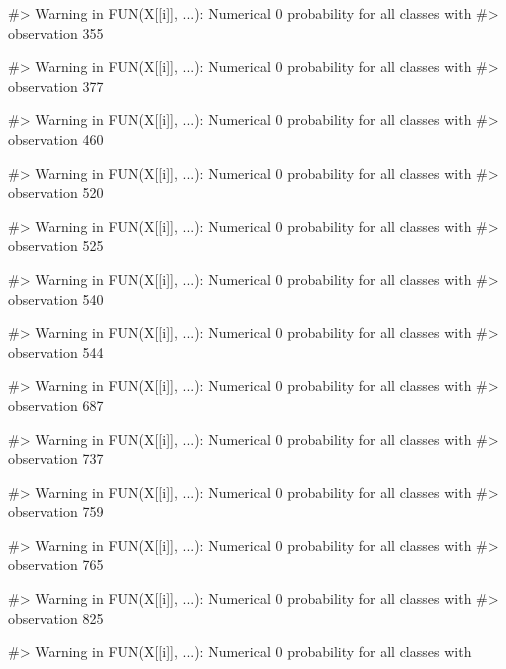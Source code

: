 \begin{Schunk}
\begin{Soutput}
#> Warning in FUN(X[[i]], ...): Numerical 0 probability for all classes with
#> observation 355
\end{Soutput}
\begin{Soutput}
#> Warning in FUN(X[[i]], ...): Numerical 0 probability for all classes with
#> observation 377
\end{Soutput}
\begin{Soutput}
#> Warning in FUN(X[[i]], ...): Numerical 0 probability for all classes with
#> observation 460
\end{Soutput}
\begin{Soutput}
#> Warning in FUN(X[[i]], ...): Numerical 0 probability for all classes with
#> observation 520
\end{Soutput}
\begin{Soutput}
#> Warning in FUN(X[[i]], ...): Numerical 0 probability for all classes with
#> observation 525
\end{Soutput}
\begin{Soutput}
#> Warning in FUN(X[[i]], ...): Numerical 0 probability for all classes with
#> observation 540
\end{Soutput}
\begin{Soutput}
#> Warning in FUN(X[[i]], ...): Numerical 0 probability for all classes with
#> observation 544
\end{Soutput}
\begin{Soutput}
#> Warning in FUN(X[[i]], ...): Numerical 0 probability for all classes with
#> observation 687
\end{Soutput}
\begin{Soutput}
#> Warning in FUN(X[[i]], ...): Numerical 0 probability for all classes with
#> observation 737
\end{Soutput}
\begin{Soutput}
#> Warning in FUN(X[[i]], ...): Numerical 0 probability for all classes with
#> observation 759
\end{Soutput}
\begin{Soutput}
#> Warning in FUN(X[[i]], ...): Numerical 0 probability for all classes with
#> observation 765
\end{Soutput}
\begin{Soutput}
#> Warning in FUN(X[[i]], ...): Numerical 0 probability for all classes with
#> observation 825
\end{Soutput}
\begin{Soutput}
#> Warning in FUN(X[[i]], ...): Numerical 0 probability for all classes with

\end{Soutput}
\end{Schunk}
